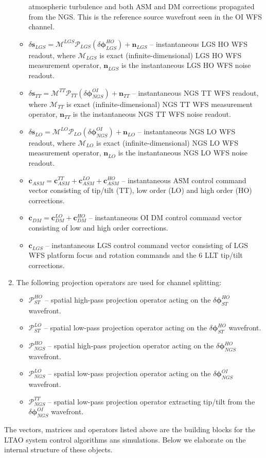 \begin{enumerate}
\begin{itemize}
		atmospheric turbulence and both ASM and DM corrections propagated from the
		NGS. This is the reference source wavefront seen in the OI WFS channel.
		\item $\delta \bm{s}_{LGS}^{} = \mathcal{M}^{LGS} \mathcal{P}_{LGS}
		(\delta \bm{\phi}_{LGS}^{HO}) + \bm{n}_{LGS}^{}$
		-- instantaneous LGS HO WFS readout, where $\mathcal{M}_{LGS}$ is exact
		(infinite-dimensional) LGS HO WFS measurement operator, $\bm{n}_{LGS}^{}$ is
		the instantaneous LGS HO WFS noise readout.
		\item $\delta \bm{s}_{TT}^{} = \mathcal{M}^{TT} \mathcal{P}_{TT}
		(\delta \bm{\phi}_{NGS}^{OI}) + \bm{n}_{TT}^{}$
		-- instantaneous NGS TT WFS readout, where $\mathcal{M}_{TT}$ is exact
		(infinite-dimensional) NGS TT WFS measurement operator, $\bm{n}_{TT}^{}$ is
		the instantaneous NGS TT WFS noise readout.
		\item $\delta \bm{s}_{LO}^{} = \mathcal{M}^{LO} \mathcal{P}_{LO}
		(\delta \bm{\phi}_{NGS}^{OI}) + \bm{n}_{LO}^{}$
		-- instantaneous NGS LO WFS readout, where $\mathcal{M}_{LO}$ is exact
		(infinite-dimensional) NGS LO WFS measurement operator, $\bm{n}_{LO}^{}$ is
		the instantaneous NGS LO WFS noise readout.
		\item $\bm{c}_{ASM}^{} = \bm{c}^{TT}_{ASM} + \bm{c}^{LO}_{ASM} +
		\bm{c}^{HO}_{ASM}$ -- instantaneous ASM control command vector consisting
		of tip/tilt (TT), low order (LO) and high order (HO) corrections.
		\item $\bm{c}_{DM}^{} = \bm{c}^{LO}_{DM} + \bm{c}^{HO}_{DM}$ --
		instantaneous OI DM
		control command vector consisting of low and high order corrections.
		\item $\bm{c}_{LGS}^{}$ -- instantaneous LGS control command vector
		consisting of LGS WFS platform focus and rotation commands and the 6 LLT
		tip/tilt corrections.
	\end{itemize}
	\item The following projection operators are used for channel splitting:
	\begin{itemize}
		\item $\mathcal{P}_{ST}^{HO}$ -- spatial high-pass projection operator
		acting on the $\delta \bm{\phi}_{ST}^{HO}$ wavefront.
		\item $\mathcal{P}_{ST}^{LO}$ -- spatial low-pass projection operator
		acting on the $\delta \bm{\phi}_{ST}^{HO}$ wavefront.
		\item $\mathcal{P}_{NGS}^{HO}$ -- spatial high-pass projection operator
		acting on the $\delta \bm{\phi}_{NGS}^{HO}$ wavefront.
		\item $\mathcal{P}_{NGS}^{LO}$ -- spatial low-pass projection operator
		acting on the $\delta \bm{\phi}_{NGS}^{OI}$ wavefront.
		\item $\mathcal{P}_{NGS}^{TT}$ -- spatial low-pass projection operator
		extracting tip/tilt from the $\delta \bm{\phi}_{NGS}^{OI}$ wavefront.
	\end{itemize}

\end{enumerate}
The vectors, matrices and operators listed above are the
building blocks for the LTAO system control algorithms ans simulations. Below
we elaborate on the internal structure of these objects.

